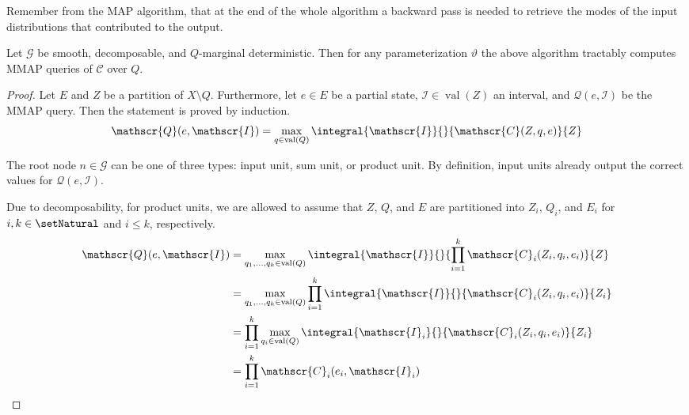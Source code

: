\documentclass[9pt,fleqn,twoside,twocolumn]{stdglobal}
\DeclareMathOperator{\val}{val}
\begin{document}
  \noindent
  Remember from the MAP algorithm, that at the end of the whole algorithm a backward pass is needed to retrieve the modes of the input distributions that contributed to the output.

  \begin{theorem*}
    Let $\mathscr{G}$ be smooth, decomposable, and $Q$-marginal deterministic.
    Then for any parameterization $ϑ$ the above algorithm
    tractably computes MMAP queries of $\mathscr{C}$ over $Q$.
  \end{theorem*}
  \begin{proof}
    Let $E$ and $Z$ be a partition of $X\setminus Q$.
    Furthermore, let $e\in E$ be a partial state, $\mathscr{I}\in\val(Z)$ an interval, and $\mathscr{Q}(e,\mathscr{I})$ be the MMAP query.
    Then the statement is proved by induction.
    \[
      \mathscr{Q}(e,\mathscr{I}) = \max_{q\in\val(Q)} \integral{\mathscr{I}}{}{\mathscr{C}(Z,q,e)}{Z}
    \]

    The root node $n\in\mathscr{G}$ can be one of three types: input unit, sum unit, or product unit.
    By definition, input units already output the correct values for $\mathscr{Q}(e,\mathscr{I})$.

    Due to decomposability, for product units, we are allowed to assume that $Z$, $Q$, and $E$ are partitioned into $Z_i$, $Q_i$, and $E_i$ for $i,k\in\setNatural$ and $i\leq k$, respectively.
    \begin{align*}
      \mathscr{Q}(e,\mathscr{I}) &= \max_{q_1,\ldots,q_k\in\val(Q)} \integral{\mathscr{I}}{}{\prod_{i=1}^k\mathscr{C}_i(Z_i,q_i,e_i)}{Z} \\
      &= \max_{q_1,\ldots,q_k\in\val(Q)} \prod_{i=1}^k \integral{\mathscr{I}}{}{\mathscr{C}_i(Z_i,q_i,e_i)}{Z_i} \\
      &= \prod_{i=1}^k \max_{q_i\in\val(Q)} \integral{\mathscr{I}_i}{}{\mathscr{C}_i(Z_i,q_i,e_i)}{Z_i} \\
      &= \prod_{i=1}^k \mathscr{C}_i(e_i,\mathscr{I}_i)
    \end{align*}


\end{proof}
\end{document}
